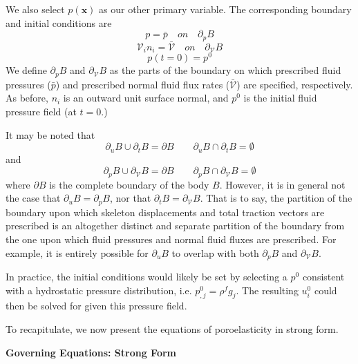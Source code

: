 \documentclass[11pt]{article} %
\begin{document}
We also select $p(\mathbf{x})$ as our other primary variable. The corresponding boundary and initial conditions are
\begin{equation}
	p = \bar{p} \quad on \quad \partial_p B
\end{equation}
\begin{equation}
	\mathcal{V}_i n_i = \bar{\mathcal{V}} \quad on \quad \partial_{\mathcal{V}} B
\end{equation}
\begin{equation}
	p (t=0) = p^0
\end{equation}
We define $\partial_p B$ and $\partial_{\mathcal{V}} B$ as the parts of the boundary on which prescribed fluid pressures ($\bar{p}$) and prescribed normal fluid flux rates ($\bar{\mathcal{V}}$) are specified, respectively. As before, $n_i$ is an outward unit surface normal, and $p^0$ is the initial fluid pressure field (at $t=0$.)

It may be noted that
\begin{equation}
	\partial_u B \cup \partial_{t} B = \partial B \qquad \partial_u B \cap \partial_{t} B = \emptyset
\end{equation}
and
\begin{equation}
	\partial_p B \cup \partial_{\mathcal{V}} B = \partial B \qquad \partial_p B \cap \partial_{\mathcal{V}} B = \emptyset
\end{equation}
where $\partial B$ is the complete boundary of the body $B$. However, it is in general not the case that $\partial_u B = \partial_p B$, nor that $\partial_t B = \partial_{\mathcal{V}} B$. That is to say, the partition of the boundary upon which skeleton displacements and total traction vectors are prescribed is an altogether distinct and separate partition of the boundary from the one upon which fluid pressures and normal fluid fluxes are prescribed. For example, it is entirely possible for $\partial_u B$ to overlap with both $\partial_p B$ and $\partial_{\mathcal{V}} B$.

In practice, the initial conditions would likely be set by selecting a $p^0$ consistent with a hydrostatic pressure distribution, i.e. $p_{,j}^0 = \rho^f g_j$. The resulting $u_i^0$ could then be solved for given this pressure field.

To recapitulate, we now present the equations of poroelasticity in strong form.

\begin{center} \textbf{Governing Equations: Strong Form} \end{center}
\end{document}
